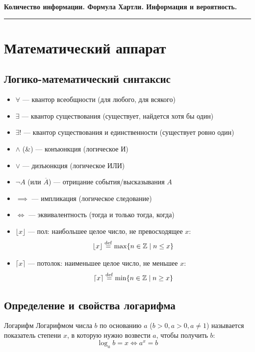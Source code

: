 \documentclass[11pt,a4paper]{article}
\begin{document}
\begin{center}
    {\LARGE \textbf{Количество информации. Формула Хартли. Информация и вероятность.}}\\[0.2cm]
    \rule{\textwidth}{1pt}
\end{center}

\section{Математический аппарат}

\subsection{Логико-математический синтаксис}
\begin{itemize}
    \item $\forall$ --- квантор всеобщности (для любого, для всякого)
    \item $\exists$ --- квантор существования (существует, найдется хотя бы один)
    \item $\exists!$ --- квантор существования и единственности (существует ровно один)
    \item $\land$ (\&) --- конъюнкция (логическое И)
    \item $\lor$ --- дизъюнкция (логическое ИЛИ)
    \item $\neg A$ (или $\overline{A}$) --- отрицание события/высказывания $A$
    \item $\implies$ --- импликация (логическое следование)
    \item $\iff$ --- эквивалентность (тогда и только тогда, когда)
    \item $\lfloor x \rfloor$ --- пол: наибольшее целое число, не превосходящее $x$:
    $$\lfloor x \rfloor \overset{\mathrm{def}}{=} \max \{ n \in \mathbb{Z} \mid n \le x \}$$
    \item $\lceil x \rceil$ --- потолок: наименьшее целое число, не меньшее $x$:
    $$\lceil x \rceil \overset{\mathrm{def}}{=} \min \{ n \in \mathbb{Z} \mid n \ge x \}$$
\end{itemize}

\subsection{Определение и свойства логарифма}
\begin{definitionbox}{Логарифм}
Логарифмом числа $b$ по основанию $a$ ($b > 0, a > 0, a \neq 1$) называется показатель степени $x$, в которую нужно возвести $a$, чтобы получить $b$:
$$\log_a b = x \iff a^x = b$$
\end{definitionbox}
\end{document}
